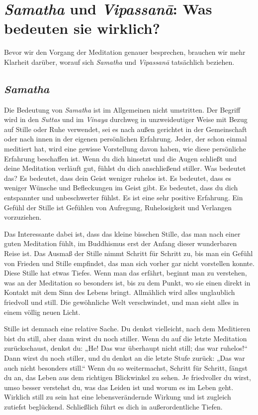 \documentclass[12pt,openany]{book}
\begin{document}
\chapter*{\textit{Samatha} und \textit{Vipas\-sanā}: Was bedeuten sie wirklich?}

Bevor wir den Vorgang der Meditation genauer besprechen, brauchen wir mehr Klarheit da\-rüber, worauf sich \textit{Samatha} und \textit{Vipas\-sanā} tatsächlich beziehen.

\section*{\textit{Samatha}}

Die Bedeutung von \textit{Samatha} ist im Allgemeinen nicht umstritten. Der Begriff wird in den \textit{Suttas} und im \textit{Vinaya} durchweg in unzweideutiger Weise mit Bezug auf Stille oder Ruhe verwendet, sei es nach außen gerichtet in der Gemeinschaft oder nach innen in der eigenen persönlichen Erfahrung. Jeder, der schon einmal meditiert hat, wird eine gewisse Vorstellung davon haben, wie diese persönliche Erfahrung beschaffen ist. Wenn du dich hinsetzt und die Augen schließt und deine Meditation verläuft gut, fühlst du dich anschließend stiller. Was bedeutet das? Es bedeutet, dass dein Geist weniger ruhelos ist. Es bedeutet, dass es weniger Wünsche und Befleckungen im Geist gibt. Es bedeutet, dass du dich entspannter und unbeschwerter fühlst. Es ist eine sehr positive Erfahrung. Ein Gefühl der Stille ist Gefühlen von Aufregung, Ruhelosigkeit und Verlangen vorzuziehen.

Das Interessante dabei ist, dass das kleine bisschen Stille, das man nach einer guten Meditation fühlt, im Buddhismus erst der Anfang dieser wunderbaren Reise ist. Das Ausmaß der Stille nimmt Schritt für Schritt zu, bis man ein Gefühl von Frieden und Stille empfindet, das man sich vorher gar nicht vorstellen konnte. Diese Stille hat etwas Tiefes. Wenn man das erfährt, beginnt man zu verstehen, was an der Meditation so besonders ist, bis zu dem Punkt, wo sie einen direkt in Kontakt mit dem Sinn des Lebens bringt. Allmählich wird alles unglaublich friedvoll und still. Die gewöhnliche Welt verschwindet, und man sieht alles in einem völlig neuen Licht.

Stille ist demnach eine relative Sache. Du denkst vielleicht, nach dem Meditieren bist du still, aber dann wirst du noch stiller. Wenn du auf die letzte Meditation zurückschaust, denkst du: „He! Das war überhaupt nicht still; das war ruhelos!“ Dann wirst du noch stiller, und du denkst an die letzte Stufe zurück: „Das war auch nicht besonders still.“ Wenn du so weitermachst, Schritt für Schritt, fängst du an, das Leben aus dem richtigen Blickwinkel zu sehen. Je friedvoller du wirst, umso besser verstehst du, was das Leiden ist und worum es im Leben geht. Wirklich still zu sein hat eine lebensverändernde Wirkung und ist zugleich zutiefst beglückend. Schließlich führt es dich in außerordentliche Tiefen.
\end{document}
